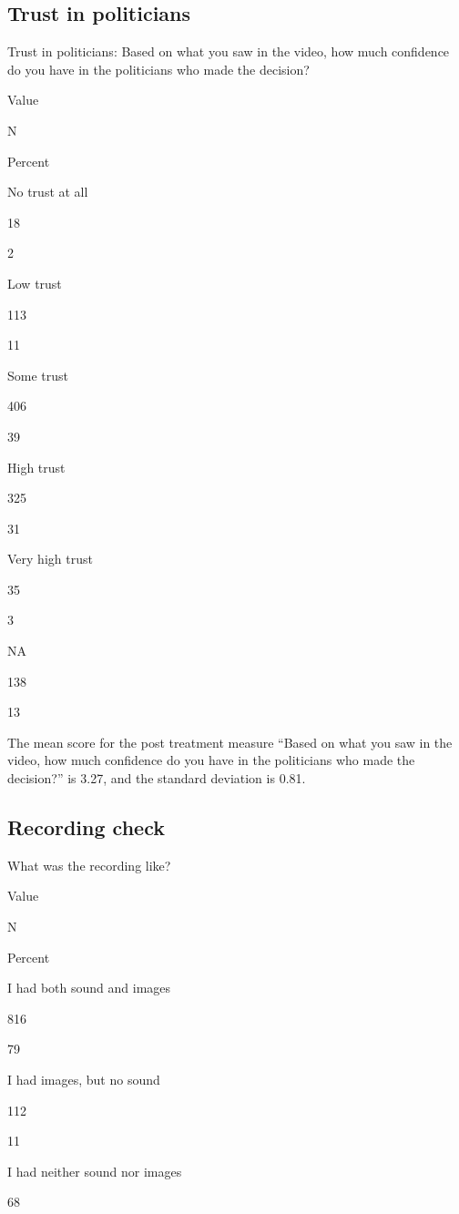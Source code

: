 \documentclass[
]{book}
\begin{document}
\hypertarget{trust-in-politicians}{%
\subsection{Trust in politicians}\label{trust-in-politicians}}

Trust in politicians: Based on what you saw in the video, how much
confidence do you have in the politicians who made the decision?

Value

N

Percent

No trust at all

18

2

Low trust

113

11

Some trust

406

39

High trust

325

31

Very high trust

35

3

NA

138

13

The mean score for the post treatment measure ``Based on what you saw in
the video, how much confidence do you have in the politicians who made
the decision?'' is 3.27, and the standard deviation is 0.81.

\hypertarget{recording-check}{%
\subsection{Recording check}\label{recording-check}}

What was the recording like?

Value

N

Percent

I had both sound and images

816

79

I had images, but no sound

112

11

I had neither sound nor images

68
\end{document}
